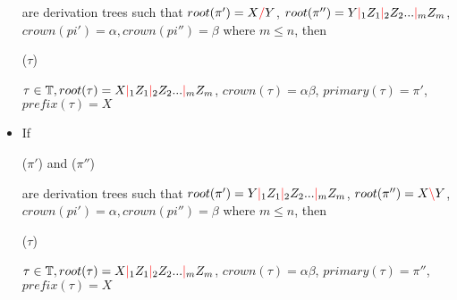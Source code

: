 \documentclass[main.tex]{subfiles}
\begin{document}
\begin{defn}
\begin{itemize}
            are derivation trees such that $ root(\pi') = X \textcolor{red}{/} Y $,
            $ root(\pi'') = Y \textcolor{red}{|}_1 Z_1 \textcolor{red}{|}_2 Z_2 ... \textcolor{red}{|}_m Z_m $,
            $ crown(pi') = \alpha, crown(pi'') = \beta $
            where $m \leq n$, then
            \begin{center}
                 ($\tau$)
            \end{center}
            $ \tau \in \mathbb{T}, root(\tau) = X \textcolor{red}{|}_1 Z_1 \textcolor{red}{|}_2 Z_2 ... \textcolor{red}{|}_m Z_m $,
            $ crown(\tau) = \alpha \beta $, $primary(\tau) = \pi'$, $prefix(\tau) = X$
        \item If
            \begin{center}
                 ($\pi'$)
                \quad and \quad
                 ($\pi''$)
            \end{center}
            are derivation trees such that
            $ root(\pi') = Y \textcolor{red}{|}_1 Z_1 \textcolor{red}{|}_2 Z_2 ... \textcolor{red}{|}_m Z_m $,
            $ root(\pi'') = X \textcolor{red}{\backslash} Y $,
            $ crown(pi') = \alpha, crown(pi'') = \beta $
            where $m \leq n$, then
            \begin{center}
                 ($\tau$)
            \end{center}
            $ \tau \in \mathbb{T}, root(\tau) = X \textcolor{red}{|}_1 Z_1 \textcolor{red}{|}_2 Z_2 ... \textcolor{red}{|}_m Z_m $,
            $ crown(\tau) = \alpha \beta $, $primary(\tau) = \pi''$, $prefix(\tau) = X$
    \end{itemize}

\end{defn}
\end{document}
